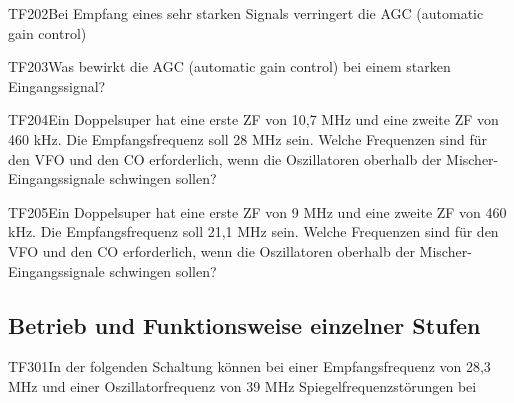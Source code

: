 \begin{question}{TF202}{Bei Empfang eines sehr starken Signals verringert die AGC (automatic gain control)}
\end{question}

\begin{question}{TF203}{Was bewirkt die AGC (automatic gain control) bei einem starken Eingangssignal?}
\end{question}

\begin{question}{TF204}{Ein Doppelsuper hat eine erste ZF von 10,7 MHz und eine zweite ZF von 460 kHz. Die Empfangsfrequenz soll 28 MHz sein. Welche Frequenzen sind für den VFO und den CO erforderlich, wenn die Oszillatoren oberhalb der Mischer-Eingangssignale schwingen sollen?}
\end{question}

\begin{question}{TF205}{Ein Doppelsuper hat eine erste ZF von 9 MHz und eine zweite ZF von 460 kHz. Die Empfangsfrequenz soll 21,1 MHz sein. Welche Frequenzen sind für den VFO und den CO erforderlich, wenn die Oszillatoren oberhalb der Mischer-Eingangssignale schwingen sollen?}
\end{question}

\subsection{Betrieb und Funktionsweise einzelner Stufen}

\begin{question}{TF301}{In der folgenden Schaltung können bei einer Empfangsfrequenz von 28,3 MHz und einer Oszillatorfrequenz von 39 MHz Spiegelfrequenzstörungen bei}
\end{question}

